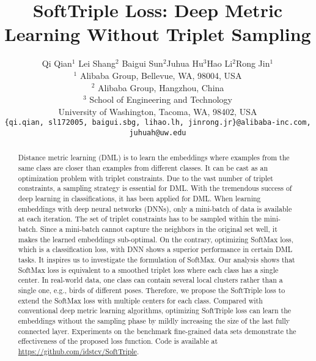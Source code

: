 \documentclass[10pt,twocolumn,letterpaper]{article}
\begin{document}
\title{SoftTriple Loss: Deep Metric Learning Without Triplet Sampling}

\author{Qi Qian$^{1}$ \quad Lei Shang$^{2}$ \quad Baigui Sun$^{2}$\quad Juhua Hu$^{3}$\quad Hao Li$^{2}$\quad Rong Jin$^{1}$\\
$^{1}$ Alibaba Group, Bellevue, WA, 98004, USA\\
$^{2}$ Alibaba Group, Hangzhou, China\\
$^{3}$ School of Engineering and Technology\\
University of Washington, Tacoma, WA, 98402, USA\\
{\tt\small \{qi.qian, sl172005, baigui.sbg, lihao.lh, jinrong.jr\}@alibaba-inc.com, juhuah@uw.edu}
}

\maketitle



\begin{abstract}
Distance metric learning (DML) is to learn the embeddings where examples from the same class are closer than examples from different classes. It can be cast as an optimization problem with triplet constraints. Due to the vast number of triplet constraints, a sampling strategy is essential for DML. With the tremendous success of deep learning in classifications, it has been applied for DML. When learning embeddings with deep neural networks (DNNs), only a mini-batch of data is available at each iteration. The set of triplet constraints has to be sampled within the mini-batch. Since a mini-batch cannot capture the neighbors in the original set well, it makes the learned embeddings sub-optimal. On the contrary, optimizing SoftMax loss, which is a classification loss, with DNN shows a superior performance in certain DML tasks. It inspires us to investigate the formulation of SoftMax. Our analysis shows that SoftMax loss is equivalent to a smoothed triplet loss where each class has a single center. In real-world data, one class can contain several local clusters rather than a single one, e.g., birds of different poses. Therefore, we propose the SoftTriple loss to extend the SoftMax loss with multiple centers for each class. Compared with conventional deep metric learning algorithms, optimizing SoftTriple loss can learn the embeddings without the sampling phase by mildly increasing the size of the last fully connected layer. Experiments on the benchmark fine-grained data sets demonstrate the effectiveness of the proposed loss function. Code is available at \url{https://github.com/idstcv/SoftTriple}.
\end{abstract}
\end{document}
